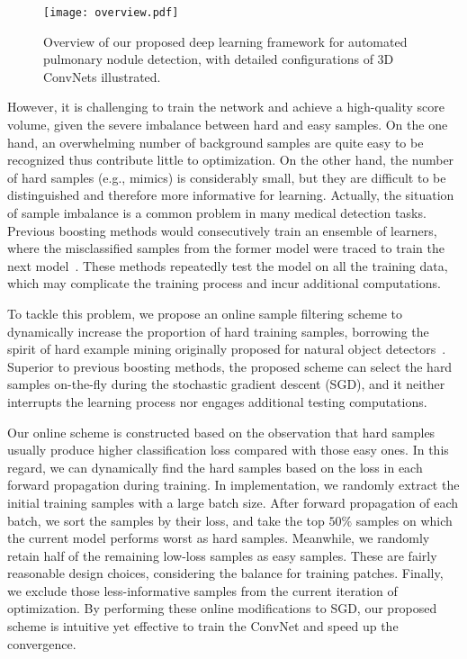 \documentclass{llncs}
\begin{document}
\begin{figure}[t]
\centering
\texttt{[image: overview.pdf]}
\vspace{-2mm}
\caption{Overview of our proposed deep learning framework for automated pulmonary nodule detection, with detailed configurations of 3D ConvNets illustrated.}
\label{fig:overview}
\vspace{-4mm}
\end{figure}


However, it is challenging to train the network and achieve a high-quality score volume, given the severe imbalance between hard and easy samples.
On the one hand, an overwhelming number of background samples are quite easy to be recognized thus contribute little to optimization.
On the other hand, the number of hard samples (e.g., mimics) is considerably small, but they are difficult to be distinguished and therefore more informative for learning.
Actually, the situation of sample imbalance is a common problem in many medical detection tasks.
Previous boosting methods would consecutively train an ensemble of learners, where the misclassified samples from the former model were traced to train the next model~\cite{cirecsan2013mitosis}.
These methods repeatedly test the model on all the training data, which may complicate the training process and incur additional computations.

To tackle this problem, we propose an online sample filtering scheme to dynamically increase the proportion of hard training samples, borrowing the spirit of hard example mining originally proposed for natural object detectors~\cite{shrivastava2016training}.
Superior to previous boosting methods, the proposed scheme can select the hard samples on-the-fly during the stochastic gradient descent (SGD), and it neither interrupts the learning process nor engages additional testing computations.

Our online scheme is constructed based on the observation that hard samples usually produce higher classification loss compared with those easy ones.
In this regard, we can dynamically find the hard samples based on the loss in each forward propagation during training.
In implementation, we randomly extract the initial training samples with a large batch size.
After forward propagation of each batch, we sort the samples by their loss, and take the top $50\%$ samples on which the current model performs worst as hard samples.
Meanwhile, we randomly retain half of the remaining low-loss samples as easy samples.
These are fairly reasonable design choices, considering the balance for training patches.
Finally, we exclude those less-informative samples from the current iteration of optimization.
By performing these online modifications to SGD, our proposed scheme is intuitive yet effective to
train the ConvNet and speed up the convergence.
\end{document}
